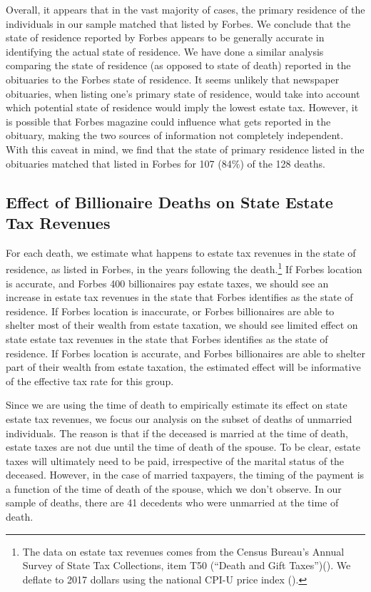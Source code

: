 \documentclass[12pt]{article}
\begin{document}
Overall, it appears that in the vast majority of cases, the primary residence of the individuals in our sample matched that listed by Forbes. We conclude that the state of residence reported by Forbes appears to be generally accurate in identifying the actual state of residence.
We have done a similar analysis comparing the state of residence (as opposed to state of death) reported in the obituaries to the Forbes state of residence. It seems unlikely that newspaper obituaries, when listing one's primary state of residence, would take into account which potential state of residence would imply the lowest estate tax. However, it is possible that  Forbes magazine could influence what gets reported in the obituary, making the two sources of information not completely independent.  With this caveat in mind, we find that the state of primary residence listed in the obituaries matched that listed in Forbes for 107 (84\%) of the 128 deaths. 


\subsection{Effect of Billionaire Deaths on State Estate Tax Revenues} 
 
For each death, we  estimate what happens to estate tax revenues in the state of residence, as listed in Forbes, in the years following the death.\footnote{The data on estate tax revenues comes from the Census Bureau's Annual Survey of State Tax Collections, item T50 (``Death and Gift Taxes'')(\cite{stc}). We deflate to 2017 dollars using the national CPI-U price index (\cite{CPI}).} If Forbes location is accurate, and Forbes 400 billionaires pay  estate taxes, we should see an increase in estate tax revenues in the state that Forbes identifies as the state of residence. If Forbes location is inaccurate, or Forbes billionaires are able to shelter most of their wealth from estate taxation, we should see limited effect on state estate tax revenues in the state that Forbes identifies as the state of residence. 
If Forbes location is accurate, and Forbes billionaires are able to shelter part of their wealth from estate taxation, the estimated effect will be informative of the effective tax rate for this group.  

Since we are using the time of death to empirically estimate its effect on state estate tax revenues, we focus our analysis on the subset of deaths of unmarried individuals. The reason is that if the deceased is married at the time of death, estate taxes are not due until the time of death of the spouse. To be clear, estate taxes will ultimately need to be paid, irrespective of the marital status of the deceased. However, in the case of married taxpayers, the timing of the payment is a function of the time of death of the spouse, which we don't observe. In our sample of deaths, there are 41 decedents who were unmarried at the time of death.
\end{document}
